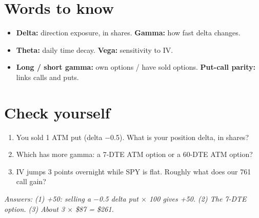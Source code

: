 \documentclass{article}
\begin{document}
\section{Words to know}

\begin{itemize}

\item \textbf{Delta:} direction exposure, in shares. \textbf{Gamma:} how fast delta changes.

\item \textbf{Theta:} daily time decay. \textbf{Vega:} sensitivity to IV.

\item \textbf{Long /\allowbreak{} short gamma:} own options /\allowbreak{} have sold options. \textbf{Put-call parity:} links calls and puts.

\end{itemize}

\section{Check yourself}

\begin{enumerate}

\item You sold 1 ATM put (delta \ensuremath{-}0.5). What is your position delta, in shares?

\item Which has more gamma: a 7-DTE ATM option or a 60-DTE ATM option?

\item IV jumps 3 points overnight while SPY is flat. Roughly what does our 761 call gain?

\end{enumerate}

\emph{Answers: (1) +50: selling a \ensuremath{-}0.5 delta put \ensuremath{\times} 100 gives +50. (2) The 7-DTE option. (3) About 3 \ensuremath{\times} \$87 = \$261.}
\end{document}
